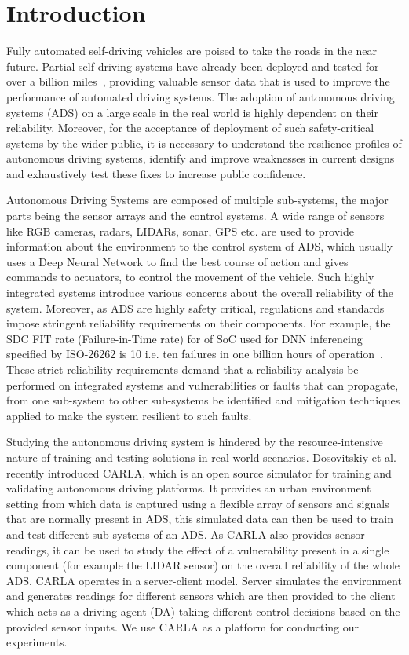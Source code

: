 \section{Introduction}

Fully automated self-driving vehicles are poised to take the roads in the near future. Partial self-driving systems have already been deployed and tested for over a billion miles~\cite{teslasr},  providing valuable sensor data that is used to improve the performance of automated driving systems. The adoption of autonomous driving systems (ADS) on a large scale in the real world is highly dependent on their reliability. Moreover, for the acceptance of deployment of such safety-critical systems by the wider public, it is necessary to understand the resilience profiles of autonomous driving systems, identify and improve weaknesses in current designs and exhaustively test these fixes to increase public confidence.

 
Autonomous Driving Systems are composed of multiple sub-systems, the major parts being the sensor arrays and the control systems. A wide range of sensors like RGB cameras, radars, LIDARs, sonar, GPS etc. are used to provide information about the environment to the control system of ADS, which usually uses a Deep Neural Network to find the best course of action and gives commands to actuators, to control the movement of the vehicle. Such highly integrated systems introduce various concerns about the overall reliability of the system. Moreover, as ADS are highly safety critical, regulations and standards impose stringent reliability requirements on their components. For example, the SDC FIT rate (Failure-in-Time rate) for of SoC used for DNN inferencing specified by ISO-26262 is 10 i.e. ten failures in one billion hours of operation~\cite{guanpeng17sc}. These strict reliability requirements demand that a reliability analysis be performed on integrated systems and vulnerabilities or faults that can propagate, from one sub-system to other sub-systems be identified and mitigation techniques applied to make the system resilient to such faults.

Studying the autonomous driving system is hindered by the resource-intensive nature of training and testing solutions in real-world scenarios. Dosovitskiy et al.~\cite{Dosovitskiy17} recently introduced CARLA, which is an open source simulator for training and validating autonomous driving platforms. It provides an urban environment setting from which data is captured using a flexible array of sensors and signals that are normally present in ADS, this simulated data can then be used to train and test different sub-systems of an ADS. As CARLA also provides sensor readings, it can be used to study the effect of a vulnerability present in a single component (for example the LIDAR sensor) on the overall reliability of the whole ADS. CARLA operates in a server-client model. Server simulates the environment and generates readings for different sensors which are then provided to the client which acts as a driving agent (DA) taking different control decisions based on the provided sensor inputs. We use CARLA as a platform for conducting our experiments.

